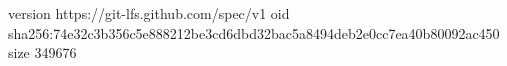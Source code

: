 version https://git-lfs.github.com/spec/v1
oid sha256:74e32c3b356c5e888212be3cd6dbd32bac5a8494deb2e0cc7ea40b80092ac450
size 349676
